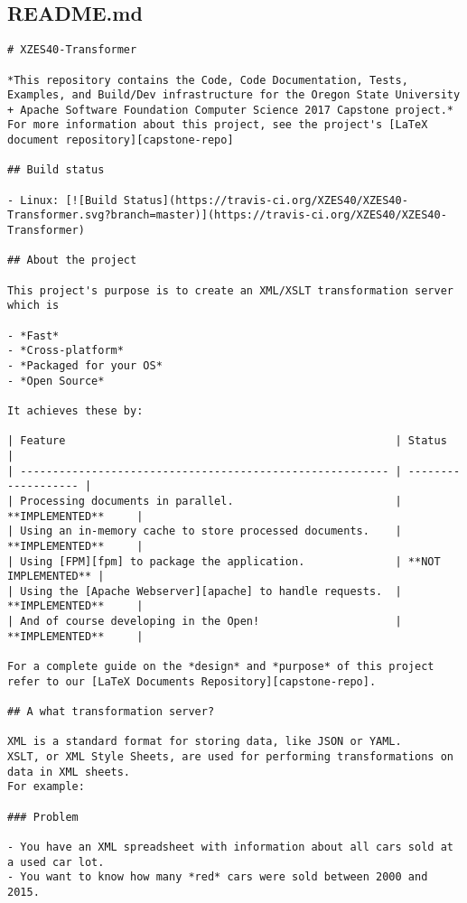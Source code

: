 \subsection{README.md}
\begin{lstlisting}[caption={XZES40-Transformer project REDME}]
# XZES40-Transformer

*This repository contains the Code, Code Documentation, Tests, Examples, and Build/Dev infrastructure for the Oregon State University + Apache Software Foundation Computer Science 2017 Capstone project.*
For more information about this project, see the project's [LaTeX document repository][capstone-repo]

## Build status

- Linux: [![Build Status](https://travis-ci.org/XZES40/XZES40-Transformer.svg?branch=master)](https://travis-ci.org/XZES40/XZES40-Transformer)

## About the project

This project's purpose is to create an XML/XSLT transformation server which is

- *Fast*
- *Cross-platform*
- *Packaged for your OS*
- *Open Source*

It achieves these by:

| Feature                                                   | Status              |
| --------------------------------------------------------- | ------------------- |
| Processing documents in parallel.                         | **IMPLEMENTED**     |
| Using an in-memory cache to store processed documents.    | **IMPLEMENTED**     |
| Using [FPM][fpm] to package the application.              | **NOT IMPLEMENTED** |
| Using the [Apache Webserver][apache] to handle requests.  | **IMPLEMENTED**     |
| And of course developing in the Open!                     | **IMPLEMENTED**     |

For a complete guide on the *design* and *purpose* of this project refer to our [LaTeX Documents Repository][capstone-repo].

## A what transformation server?

XML is a standard format for storing data, like JSON or YAML.
XSLT, or XML Style Sheets, are used for performing transformations on data in XML sheets.
For example:

### Problem

- You have an XML spreadsheet with information about all cars sold at a used car lot.
- You want to know how many *red* cars were sold between 2000 and 2015.


\end{lstlisting}
